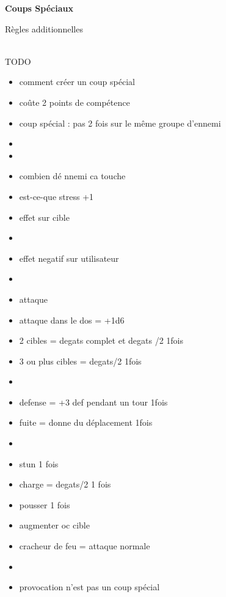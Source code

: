 \documentclass[11pt]{article} %
\newcommand{\myjump}[1][1]{\mbox{}\\[#1cm]}
\begin{document}
\pagestyle{empty}

\begin{center}
    \textbf{Coups Spéciaux}

    Règles additionnelles
\end{center}


\myjump
TODO

\begin{itemize}
    \item comment créer un coup spécial
    \item coûte 2 points de compétence
    \item coup spécial : pas 2 fois sur le même groupe d'ennemi
    \item
    \item
    \item combien dé nnemi ca touche
    \item est-ce-que stress +1
    \item effet sur cible
    \item
    \item effet negatif sur utilisateur
    \item
    \item attaque
    \item attaque dans le dos = +1d6
    \item 2 cibles = degats complet et degats /2 1fois
    \item 3 ou plus cibles = degats/2 1fois
    \item
    \item defense = +3 def pendant un tour 1fois
    \item fuite = donne du déplacement 1fois
    \item
    \item stun 1 fois
    \item charge = degats/2 1 fois
    \item pousser 1 fois
    \item augmenter oc cible
    \item cracheur de feu = attaque normale
    \item
    \item provocation n'est pas un coup spécial

\end{itemize}
\end{document}
